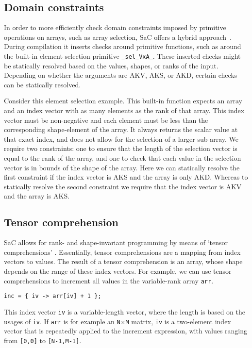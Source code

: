 \subsection{Domain constraints}

In order to more efficiently check domain constraints imposed by primitive operations on arrays, such as array selection, SaC offers a hybrid approach~\cite{sac-contracts}.
During compilation it inserts checks around primitive functions, such as around the built-in element selection primitive \verb|_sel_VxA_|.
These inserted checks might be statically resolved based on the values, shapes, or ranks of the input.
Depending on whether the arguments are AKV, AKS, or AKD, certain checks can be statically resolved.

Consider this element selection example.
This built-in function expects an array and an index vector with as many elements as the rank of that array.
This index vector must be non-negative and each element must be less than the corresponding shape-element of the array.
It always returns the scalar value at that exact index, and does not allow for the selection of a larger sub-array.
We require two constraints: one to ensure that the length of the selection vector is equal to the rank of the array, and one to check that each value in the selection vector is in bounds of the shape of the array.
Here we can statically resolve the first constraint if the index vector is AKS and the array is only AKD.
Whereas to statically resolve the second constraint we require that the index vector is AKV and the array is AKS.

\subsection{Tensor comprehension}

SaC allows for rank- and shape-invariant programming by means of `tensor comprehensions' \cite{sac-tensor}.
Essentially, tensor comprehensions are a mapping from index vectors to values.
The result of a tensor comprehension is an array, whose shape depends on the range of these index vectors.
For example, we can use tensor comprehensions to increment all values in the variable-rank array \texttt{arr}.
\begin{lstlisting}
inc = { iv -> arr[iv] + 1 };
\end{lstlisting}

\noindent
This index vector \texttt{iv} is a variable-length vector, where the length is based on the usages of \texttt{iv}.
If \texttt{arr} is for example an \texttt{N$\times$M} matrix, \texttt{iv} is a two-element index vector that is repeatedly applied to the increment expression, with values ranging from \texttt{[0,0]} to \texttt{[N-1,M-1]}.

